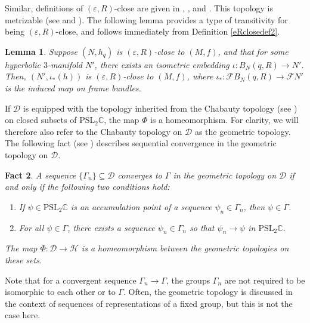 \documentclass[11pt,leqno]{article}
\newtheorem{lemma}{Lemma}
\newtheorem{fact}[lemma]{Fact}
\theoremstyle{introdef}
\numberwithin{lemma}{section}
\theoremstyle{definition}
\newcommand{\C}{\mathbb{C}}
\begin{document}
Similar, definitions of $(\varepsilon,R)$-close are given in \cite{BEN}, \cite{NOTE}, and \cite{PUR}. This topology is metrizable (see \cite[E.1.4]{BEN} and \cite{IANMET}). The following lemma provides a type of transitivity for being $(\varepsilon,R)$-close, and follows immediately from Definition \ref{eRclosedef2}.\par

\begin{lemma}
    \label{lemma-eRTransitivity}
    Suppose $(N,h_q)$ is $(\varepsilon,R)$-close to $(M,f)$, and that for some hyperbolic $3$-manifold $N'$, there exists an isometric embedding $\iota: B_N(q,R)\rightarrow N'$. Then, $(N',\iota_*(h))$ is $(\varepsilon,R)$-close to $(M,f)$, where $\iota_*:\mathcal{F}B_N(q,R)\rightarrow\mathcal{F}N'$ is the induced map on frame bundles.
\end{lemma}

If $\mathcal{D}$ is equipped with the topology inherited from the Chabauty topology (see \cite[Section E]{BEN}) on closed subsets of $\mathrm{PSL}_2\C$, the map $\Phi$ is a homeomorphism. For clarity, we will therefore also refer to the Chabauty topology on $\mathcal{D}$ as the geometric topology. The following fact (see \cite[Proposition E.1.2]{BEN}) describes sequential convergence in the geometric topology on $\mathcal{D}$.

\begin{fact}
\label{ChabProps}
    A sequence $\{\Gamma_n\}\subseteq\mathcal{D}$ converges to $\Gamma$ in the geometric topology on $\mathcal{D}$ if and only if the following two conditions hold:
    \begin{enumerate}
        \item If $\psi\in\mathrm{PSL}_2\C$ is an accumulation point of a sequence $\psi_n\in\Gamma_n$, then $\psi\in\Gamma$.
        \item For all $\psi\in\Gamma$, there exists a sequence $\psi_n\in\Gamma_n$ so that $\psi_n\rightarrow\psi$ in $\mathrm{PSL}_2\C$.
    \end{enumerate}
    The map $\Phi:\mathcal{D}\rightarrow\mathcal{H}$ is a homeomorphism between the geometric topologies on these sets.
\end{fact}


Note that for a convergent sequence $\Gamma_n\rightarrow\Gamma$, the groups $\Gamma_n$ are not required to be isomorphic to each other or to $\Gamma$. Often, the geometric topology is discussed in the context of sequences of representations of a fixed group, but this is not the case here.\par
\end{document}
